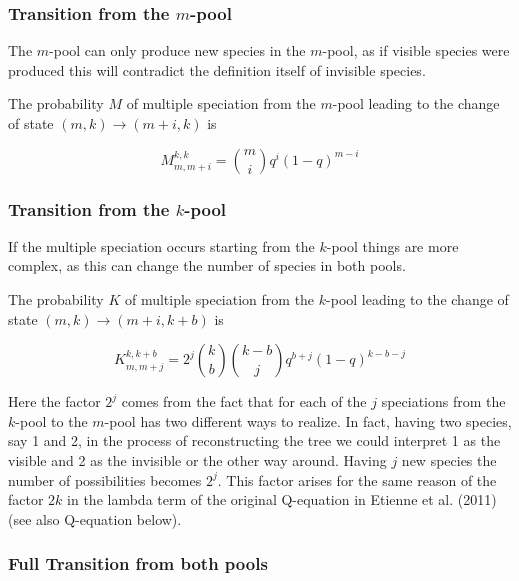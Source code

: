 \documentclass[]{article}
\begin{document}
\hypertarget{transition-from-the-m-pool}{%
\subsubsection{\texorpdfstring{Transition from the \(m\)-pool}{Transition from the m-pool}}\label{transition-from-the-m-pool}}

The \(m\)-pool can only produce new species in the \(m\)-pool, as if visible species
were produced this will contradict the definition itself of invisible species.

The probability \(M\) of multiple speciation from the \(m\)-pool leading to the change
of state \((m,k) \rightarrow (m + i, k)\) is

\[
M^{k,k}_{m,m + i} = \binom{m}{i} q ^ i (1 - q) ^ {m - i}
\]

\hypertarget{transition-from-the-k-pool}{%
\subsubsection{\texorpdfstring{Transition from the \(k\)-pool}{Transition from the k-pool}}\label{transition-from-the-k-pool}}

If the multiple speciation occurs starting from the \(k\)-pool things are more complex,
as this can change the number of species in both pools.

The probability \(K\) of multiple speciation from the \(k\)-pool leading to the change
of state \((m,k) \rightarrow (m + i, k + b)\) is

\[
K^{k, k + b}_{m, m + j} = 2 ^ j \binom{k}{b} \binom{k - b}{j} q ^ {b + j} (1 - q) ^ {k - b - j}
\]

Here the factor \(2 ^ j\) comes from the fact that for each of the \(j\) speciations
from the \(k\)-pool to the \(m\)-pool has two different ways to realize. In fact,
having two species, say 1 and 2, in the process of reconstructing
the tree we could interpret 1 as the visible and 2 as the invisible or the other
way around. Having \(j\) new species the number of possibilities becomes \(2 ^ j\).
This factor arises for the same reason of the factor \(2k\) in the lambda term
of the original Q-equation in Etienne et al. (2011) (see also Q-equation below).

\hypertarget{full-transition-from-both-pools}{%
\subsubsection{Full Transition from both pools}\label{full-transition-from-both-pools}}
\end{document}
